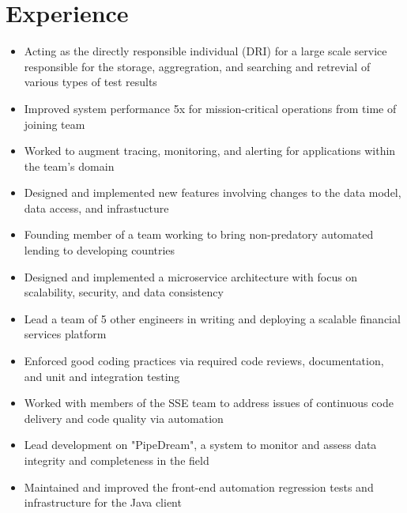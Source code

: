 \documentclass[11pt,letterpaper,sans]{moderncv}        %
\begin{document}
\makecvtitle

\vspace{-10mm}

\section{Experience}

\begin{itemize}
\item Acting as the directly responsible individual (DRI) for a large scale service responsible for the storage, aggregration, and searching and retrevial of various types of test results
\item Improved system performance 5x for mission-critical operations from time of joining team
\item Worked to augment tracing, monitoring, and alerting for applications within the team's domain
\item Designed and implemented new features involving changes to the data model, data access, and infrastucture
\end{itemize}

\begin{itemize}
\item Founding member of a team working to bring non-predatory automated lending to developing countries
\item Designed and implemented a microservice architecture with focus on scalability, security, and data consistency
\item Lead a team of 5 other engineers in writing and deploying a scalable financial services platform
\item Enforced good coding practices via required code reviews, documentation, and unit and integration testing
\end{itemize}

\begin{itemize}
\item Worked with members of the SSE team to address issues of continuous code delivery and code quality via automation
\item Lead development on "PipeDream", a system to monitor and assess data integrity and completeness in the field
\item Maintained and improved the front-end automation regression tests and infrastructure for the Java client
\end{itemize}
\end{document}

